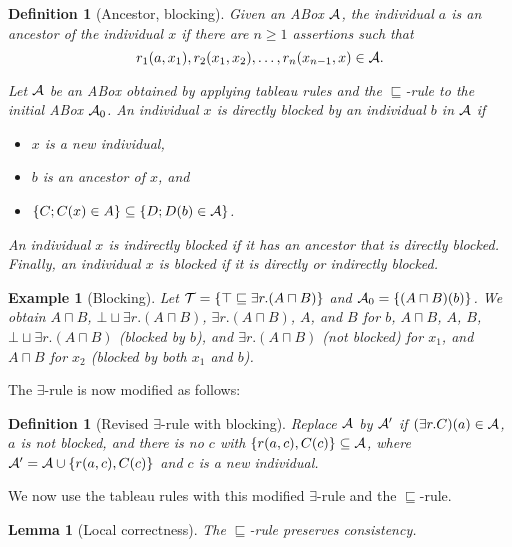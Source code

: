\documentclass[openany]{scrbook}
\theoremstyle{break}
\newtheorem{Lemma}[Theorem]{Lemma}
\newtheorem{Definition}[Theorem]{Definition}
\theoremstyle{nonumberbreak}
\newtheorem{Example}{Example}
\theoremstyle{nonumberplain}
\theoremstyle{nonumberbreak}
\newcommand{\set}[1]{\left\{#1\right\}}
\begin{document}
\begin{Definition}[Ancestor, blocking]
  \label{4.17}
  Given an ABox ${\cal A}$, the individual $a$ is an ancestor of the
  individual $x$ if there are $n \geq 1$ assertions such that
  \begin{equation*}
    r_1(a, x_1), r_2(x_1, x_2), \dotsc, r_n(x_{n - 1}, x) \in {\cal A}.
  \end{equation*}

  Let ${\cal A}$ be an ABox obtained by applying tableau rules and the
  $\sqsubseteq$-rule to the initial ABox ${\cal A}_0$. An individual
  $x$ is directly blocked by an individual $b$ in ${\cal A}$ if
  \begin{itemize}
  \item $x$ is a new individual,
  \item $b$ is an ancestor of $x$, and
  \item $\set{C; C(x) \in A} \subseteq \set{D; D(b) \in {\cal A}}$.
  \end{itemize}

  An individual $x$ is indirectly blocked if it has an ancestor that
  is directly blocked. Finally, an individual $x$ is blocked if it is
  directly or indirectly blocked.
\end{Definition}

\begin{Example}[Blocking]
  Let ${\cal T} = \set{\top \sqsubseteq \exists r.(A \sqcap B)}$ and
  ${\cal A}_0 = \set{(A \sqcap B)(b)}$. We obtain $A \sqcap B$, $\bot
  \sqcup \exists r.(A \sqcap B)$, $\exists r.(A \sqcap B)$, $A$, and $B$ for $b$,
  $A \sqcap B$, $A$, $B$, $\bot \sqcup \exists r.(A \sqcap B)$
  (blocked by $b$), and
  $\exists r.(A \sqcap B)$ (not blocked) for $x_1$, and $A \sqcap B$
  for $x_2$ (blocked by both $x_1$ and $b$).
\end{Example}

The $\exists$-rule is now modified as follows:
\begin{Definition}[Revised $\exists$-rule with blocking]
  Replace ${\cal A}$ by ${\cal A}'$ if $(\exists r.C)(a) \in {\cal
    A}$, $a$ is not blocked, and there is no $c$ with $\set{r(a, c),
    C(c)} \subseteq {\cal A}$, where ${\cal A}' = {\cal A} \cup
  \set{r(a, c), C(c)}$ and $c$ is a new individual.
\end{Definition}

We now use the tableau rules with this modified $\exists$-rule and the
$\sqsubseteq$-rule.

\begin{Lemma}[Local correctness]
  \label{4.18}
  The $\sqsubseteq$-rule preserves consistency.
\end{Lemma}
\end{document}
